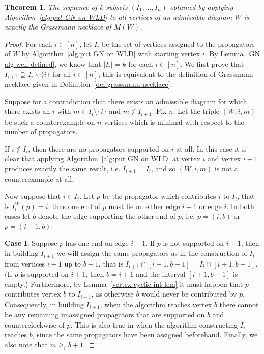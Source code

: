 \documentclass[11pt]{article}
\newtheorem{thm}{Theorem}[section]
\theoremstyle{remark}
\theoremstyle{definition}
\begin{document}
\begin{thm}\label{res:alg gives GN}
The sequence of $k$-subsets $(I_1,\dots,I_n)$ obtained by applying Algorithm~\ref{alg:put GN on WLD} to all vertices of an admissible diagram $W$ is exactly the Grassmann necklace of $M(W)$.
\end{thm}
\begin{proof}
For each $i \in [n]$, let $I_i$ be the set of vertices assigned to the propagators of $W$ by Algorithm~\ref{alg:put GN on WLD} with starting vertex $i$. By Lemma~\ref{GN alg well defined}, we know that $|I_i| = k$ for each $i \in [n]$. We first prove that $I_{i+1} \supseteq I_i \backslash \{i\}$ for all $i \in [n]$; this is equivalent to the definition of Grassmann necklace given in Definition~\ref{def:grassmann necklace}.

Suppose for a contradiction that there exists an admissible diagram for which there exists an $i$ with $m\in I_i\setminus \{i\}$ and $m \not\in I_{i+1}$.  Fix $n$.  Let the triple $(W, i, m)$ be such a counterexample on $n$ vertices which is minimal with respect to the number of propagators. %

If $i \not\in I_i$, then there are no propagators supported on $i$ at all.  In this case it is clear that applying Algorithm~\ref{alg:put GN on WLD} at vertex $i$ and vertex $i+1$ produces exactly the same result, i.e. $I_{i+1} = I_i$, and so $(W, i, m)$ is not a counterexample at all.

Now suppose that $i \in I_i$.  Let $p$ be the propagator which contributes $i$ to $I_i$, that is $I^W_i(p) = i$; thus one end of $p$ must lie on either edge $i-1$ or edge $i$.  In both cases let $b$ denote the edge supporting the other end of $p$, i.e. $p = (i, b)$ or $p = (i-1, b)$.


\textbf{Case I}:  Suppose $p$ has one end on edge $i-1$.  If $p$ is not supported on $i+1$, then in building $I_{i+1}$ we will assign the same propagators as in the construction of $I_i$ from vertices $i+1$ up to $b-1$, that is $I_{i+1} \cap [i+1,b-1] = I_{i} \cap [i+1,b-1]$.  (If $p$ is supported on $i+1$, then $b= i+1$ and the interval $[i+1,b-1]$ is empty.) Furthermore, by Lemma~\ref{vertex cyclic int lem} it must happen that $p$ contributes vertex $b$ to $I_{i+1}$, as otherwise $b$ would never be contributed by $p$. Consequently, in building $I_{i+1}$, when the algorithm reaches vertex $b$ there cannot be any remaining unassigned propagators that are supported on $b$ and counterclockwise of $p$.  This is also true in when the algorithm constructing $I_i$ reaches $b$, since the same propagators have been assigned beforehand.  Finally, we also note that $m\geq_i b+1$.


\end{proof}
\end{document}

